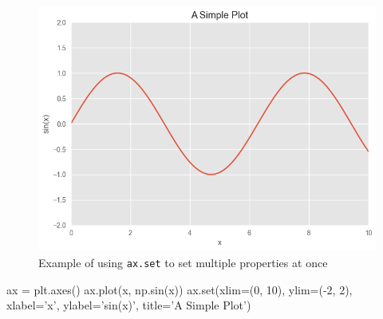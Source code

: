 \begin{figure}[H]
    \centering
    \includegraphics{../img/fig26-14.png}
    \caption{Example of using \texttt{ax.set} to set multiple properties at once}
    \label{fig26-14}
\end{figure}

\begin{pyc}
    ax = plt.axes()
    ax.plot(x, np.sin(x))
    ax.set(xlim=(0, 10), ylim=(-2, 2), xlabel='x', ylabel='sin(x)', title='A Simple Plot')
\end{pyc}